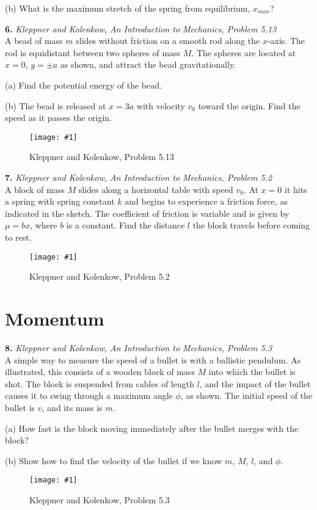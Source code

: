 \documentclass[11pt]{article}
\newcommand{\fig}[4]{
    \begin{figure}[H]
        \centering
        \texttt{[image: \#1]}
        \caption{#2}
        \label{exp4fit}
    \end{figure}
}
\theoremstyle{gangnamstyle}{\newtheorem{definition}{Definition}[]}
\theoremstyle{gangnamstyle}{\newtheorem{example}{Example}[]}
\theoremstyle{gangnamstyle}{\newtheorem{problem}{Problem}[]}
\begin{document}
(b) What is the maximum stretch of the spring from equilibrium, $x_{max}$? 

\pagebreak

\textbf{6.} \textit{Kleppner and Kolenkow, An Introduction to Mechanics, Problem 5.13} \\
A bead of mass $m$ slides without friction on a smooth rod along the $x$-axis. The rod is equidistant between two spheres of mass $M$. The spheres are located at $x = 0$, $y = \pm a$ as shown, and attract the
bead gravitationally.

(a) Find the potential energy of the bead.

(b) The bead is released at $x = 3a$ with velocity $v_0$ toward the
origin. Find the speed as it passes the origin.
\fig{figs/0715/kk513.png}{Kleppner and Kolenkow, Problem 5.13}{0.6}{0}

\pagebreak

\textbf{7.} \textit{Kleppner and Kolenkow, An Introduction to Mechanics, Problem 5.2} \\
A block of mass $M$ slides along a horizontal table with speed $v_0$.
At $x = 0$ it hits a spring with spring constant $k$ and begins to experience a friction force, as indicated in the sketch. The coefficient of friction is variable and is given by $\mu = bx$, where $b$ is a constant. Find the distance $l$ the block travels before coming to rest.
\fig{figs/0715/kk52.png}{Kleppner and Kolenkow, Problem 5.2}{0.6}{0}

\pagebreak

\section{Momentum}

\textbf{8.} \textit{Kleppner and Kolenkow, An Introduction to Mechanics, Problem 5.3} \\
A simple way to measure the speed of a bullet is with a ballistic pendulum. As illustrated, this consists of a wooden block of mass $M$ into which the bullet is shot. The block is suspended from cables of length $l$, and the impact of the bullet causes it to swing through a maximum angle $\phi$, as shown. The initial speed of the bullet is $v$, and its mass is $m$.

(a) How fast is the block moving immediately after the bullet merges with the block? 

(b) Show how to find the velocity of the bullet if we know $m$, $M$, $l$, and $\phi$.
\fig{figs/0715/kk53.png}{Kleppner and Kolenkow, Problem 5.3}{0.6}{0}
\end{document}

